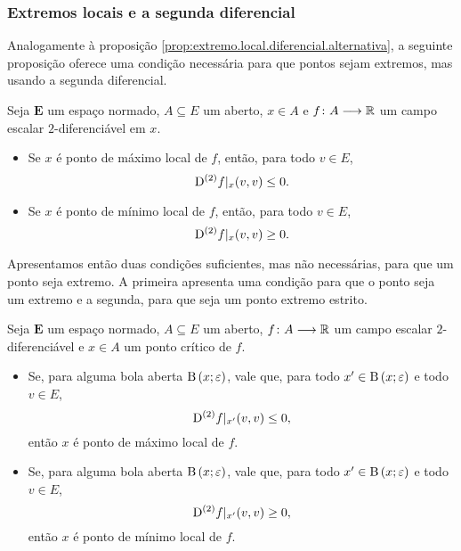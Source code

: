 \subsubsection{Extremos locais e a segunda diferencial}

Analogamente à proposição \ref{prop:extremo.local.diferencial.alternativa}, a seguinte proposição oferece uma condição necessária para que pontos sejam extremos, mas usando a segunda diferencial.

\begin{proposition}
\label{prop:extremo.local.2-diferencial}
Seja $\bm E$ um espaço normado, $A \subseteq E$ um aberto, $x \in A$ e $f\colon \allowbreak A \longrightarrow \mathbb{R}$ um campo escalar $2$-diferenciável em $x$.
	\begin{itemize}
		\item Se $x$ é ponto de máximo local de $f$, então, para todo $v \in E$,
			\begin{equation*}
			\mathrm{D}^{(2)} f|_x(v,v) \leq 0.
			\end{equation*}
		\item Se $x$ é ponto de mínimo local de $f$, então, para todo $v \in E$,
			\begin{equation*}
			\mathrm{D}^{(2)} f|_x(v,v) \geq 0.
			\end{equation*}
	\end{itemize}
\end{proposition}

Apresentamos então duas condições suficientes, mas não necessárias, para que um ponto seja extremo. A primeira apresenta uma condição para que o ponto seja um extremo e a segunda, para que seja um ponto extremo estrito.

\begin{proposition}
Seja $\bm E$ um espaço normado, $A \subseteq E$ um aberto, $f\colon \allowbreak A \longrightarrow \mathbb{R}$ um campo escalar $2$-diferenciável e $x \in A$ um ponto crítico de $f$.
	\begin{itemize}
		\item Se, para alguma bola aberta $\mathrm{B}\left(x; \varepsilon\right)$, vale que, para todo $x' \in \mathrm{B}\left(x; \varepsilon\right)$ e todo $v \in E$,
			\begin{equation*}
			\mathrm{D}^{(2)} f|_{x'}(v,v) \leq 0,
			\end{equation*}
		então $x$ é ponto de máximo local de $f$.
		\item Se, para alguma bola aberta $\mathrm{B}\left(x; \varepsilon\right)$, vale que, para todo $x' \in \mathrm{B}\left(x; \varepsilon\right)$ e todo $v \in E$,
			\begin{equation*}
			\mathrm{D}^{(2)} f|_{x'}(v,v) \geq 0,
			\end{equation*}
		então $x$ é ponto de mínimo local de $f$.
	\end{itemize}
\end{proposition}


